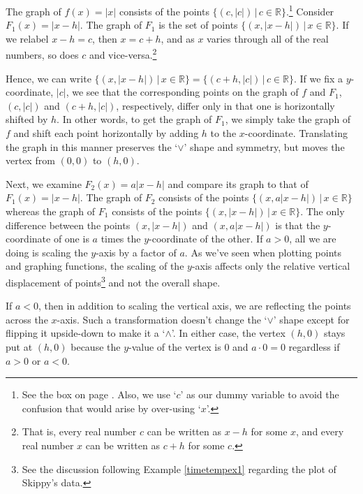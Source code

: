 \medskip

The graph of $f(x) = |x|$ consists of the points $\{ (c, |c|) \, | \, c \in \mathbb R\}$.\footnote{See the box on page \pageref{waystorepresentfunctionsbox}.  Also, we use `$c$'  as our dummy variable to avoid the confusion that would arise by over-using `$x$'.}    Consider $F_{1}(x) = |x - h|$.  The graph of $F_{1}$  is the set of points $\{ (x, |x - h|) \, | \, x \in \mathbb{R} \}$.  If we relabel $x - h = c$, then $x = c + h$, and as $x$ varies through all of the real numbers, so does $c$ and vice-versa.\footnote{That is, every real number $c$ can be written as $x - h$ for some $x$, and every real number $x$ can be written as $c + h$ for some $c$.}   

\medskip

Hence, we can write $\{ (x, |x - h|) \, | \, x \in \mathbb{R} \} = \{ (c + h, |c|) \, | \, c \in \mathbb{R} \}$.    If we fix a $y$-coordinate, $|c|$,  we see that the corresponding points on the graph of $f$ and $F_{1}$,  $(c, |c|)$ and $(c + h, |c|)$, respectively, differ only in that one is horizontally shifted by $h$.   In other words, to get the graph of $F_{1}$, we simply take the graph of $f$ and shift each point horizontally by adding $h$ to the $x$-coordinate.  Translating the graph in this manner preserves the `$\vee$' shape and symmetry, but moves the vertex from $(0, 0)$ to $(h, 0)$.

\medskip

Next, we examine $F_{2}(x) = a|x - h|$ and compare its graph to that of $F_{1}(x) = |x - h|$.  The graph of $F_{2}$ consists of the points $\{ (x, a|x - h|) \, | \, x \in \mathbb{R} \}$ whereas the graph of $F_{1}$ consists of the points $\{ (x, |x - h|) \, | \, x \in \mathbb{R} \}$.  The only difference between the points $(x, |x - h|)$ and $(x, a|x - h|)$ is that the $y$-coordinate of one is $a$ times the $y$-coordinate of the other.   If $a > 0$, all we are doing is scaling the $y$-axis by a factor of $a$.  As we've seen when plotting points and graphing functions, the scaling of the $y$-axis affects only the relative vertical displacement of points\footnote{See the discussion following Example \ref{timetempex1} regarding the plot of Skippy's data.} and not the overall shape.   

\medskip

If $a < 0$, then in addition to scaling the vertical axis, we are reflecting the points across the $x$-axis. Such a transformation doesn't change the `$\vee$' shape except for flipping it upside-down to make it a `$\wedge$'.  In either case, the vertex $(h, 0)$ stays put at $(h, 0)$ because the $y$-value of the vertex is $0$ and $a \cdot 0 = 0$ regardless if $a > 0$ or $a < 0$.

